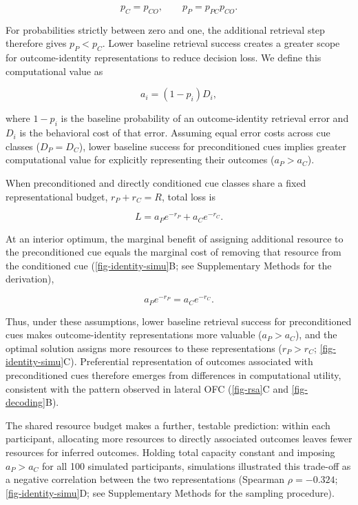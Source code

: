 \documentclass[9pt,twocolumn,twoside]{pnas-new}
\begin{document}
\begin{equation}
p_C = p_{CO}, \qquad p_P = p_{PC}p_{CO}.
\end{equation}

For probabilities strictly between zero and one, the additional retrieval step therefore gives $p_P < p_C$. Lower baseline retrieval success creates a greater scope for outcome-identity representations to reduce decision loss. We define this computational value as

\begin{equation}
a_i = (1-p_i)D_i,
\end{equation}

where $1-p_i$ is the baseline probability of an outcome-identity retrieval error and $D_i$ is the behavioral cost of that error. Assuming equal error costs across cue classes ($D_P = D_C$), lower baseline success for preconditioned cues implies greater computational value for explicitly representing their outcomes ($a_P > a_C$).

When preconditioned and directly conditioned cue classes share a fixed representational budget,
$r_P + r_C = R$, total loss is

\begin{equation}
L = a_P e^{-r_P} + a_C e^{-r_C}.
\end{equation}

At an interior optimum, the marginal benefit of assigning additional resource to the preconditioned cue equals the marginal cost of removing that resource from the conditioned cue (\autoref{fig-identity-simu}B; see Supplementary Methods for the derivation),

\begin{equation}
a_P e^{-r_P} = a_C e^{-r_C}.
\end{equation}

Thus, under these assumptions, lower baseline retrieval success for preconditioned cues makes outcome-identity representations more valuable ($a_P > a_C$), and the optimal solution assigns more resources to these representations ($r_P > r_C$; \autoref{fig-identity-simu}C). Preferential representation of outcomes associated with preconditioned cues therefore emerges from differences in computational utility, consistent with the pattern observed in lateral OFC (\autoref{fig-rsa}C and \autoref{fig-decoding}B).

The shared resource budget makes a further, testable prediction: within each participant, allocating more resources to directly associated outcomes leaves fewer resources for inferred outcomes. Holding total capacity constant and imposing $a_P>a_C$ for all 100 simulated participants, simulations illustrated this trade-off as a negative correlation between the two representations (Spearman $\rho = -0.324$; \autoref{fig-identity-simu}D; see Supplementary Methods for the sampling procedure).
\end{document}
